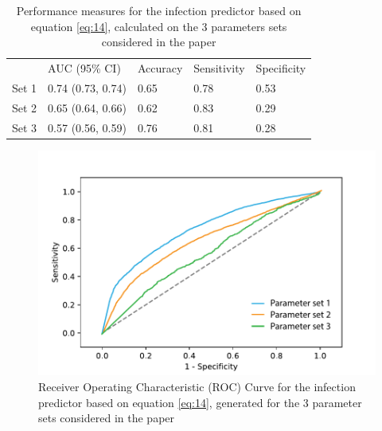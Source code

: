 \documentclass{article}
\begin{document}
\begin{table}
\caption{Performance measures for the infection predictor based on equation \eqref{eq:14}, calculated on the 3 parameters sets considered in the paper}
\centering
\begin{tabular}{lllll}
\rowcolor[rgb]{0.878,0.878,0.878}         & AUC (95\% CI)     & Accuracy & Sensitivity & Specificity  \\
{\cellcolor[rgb]{0.878,0.878,0.878}}Set 1 & 0.74 (0.73, 0.74) & 0.65     & 0.78        & 0.53         \\
{\cellcolor[rgb]{0.878,0.878,0.878}}Set 2 & 0.65 (0.64, 0.66) & 0.62     & 0.83        & 0.29         \\
{\cellcolor[rgb]{0.878,0.878,0.878}}Set 3 & 0.57 (0.56, 0.59) & 0.76     & 0.81        & 0.28   
\end{tabular}
\label{tab:table4}
\end{table}


\begin{figure} %
  \centering
  \includegraphics[scale=0.8]{Figure-4.pdf}
  \caption{Receiver Operating Characteristic (ROC) Curve for the infection predictor based on equation \eqref{eq:14}, generated for the 3 parameter sets considered in the paper}
  \label{fig:fig4}
\end{figure}
\end{document}
